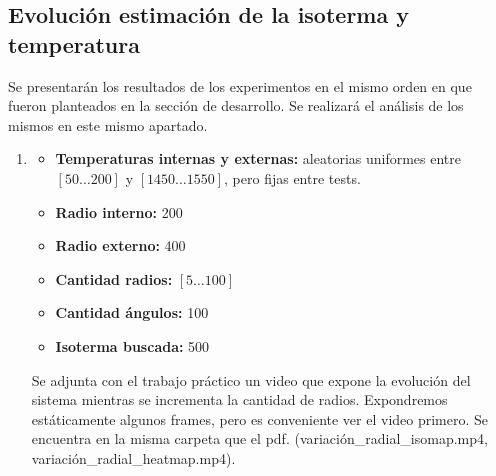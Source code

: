 \subsection{Evolución estimación de la isoterma y temperatura}
Se presentarán los resultados de los experimentos en el mismo orden en que fueron planteados en la sección de desarrollo. Se realizará el análisis de los mismos en este mismo apartado.
\begin{enumerate}
	\item \begin{itemize}
				\item \textbf{Temperaturas internas y externas:} aleatorias uniformes entre $[50\dots200]$ y $[1450\dots1550]$, pero fijas entre tests.
				\item \textbf{Radio interno:} 200
				\item \textbf{Radio externo:} 400
				\item \textbf{Cantidad radios:} $[5\dots100]$
				\item \textbf{Cantidad ángulos:} 100
				\item \textbf{Isoterma buscada:} 500
			\end{itemize}
Se adjunta con el trabajo práctico un video que expone la evolución del sistema mientras se incrementa la cantidad de radios. Expondremos estáticamente algunos frames, pero es conveniente ver el video primero. Se encuentra en la misma carpeta que el pdf. (variación\_radial\_isomap.mp4, variación\_radial\_heatmap.mp4).

\vspace{0.5cm}


\end{enumerate}
